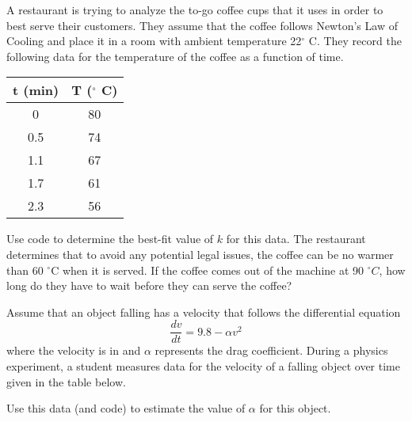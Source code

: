 \documentclass{ximera}
\begin{document}
\begin{exercise}
    A restaurant is trying to analyze the to-go coffee cups that it uses in order to best serve their customers. They assume that the coffee follows Newton's Law of Cooling and place it in a room with ambient temperature 22$^\circ$ C. They record the following data for the temperature of the coffee as a function of time.
    \begin{table}[h!!]
        \centering
        \begin{tabular}{|c|c|}\hline
             \textbf{t} (min)& \textbf{T} ($^\circ$ C)  \\ \hline
            0 & 80 \\
             0.5 & 74 \\
             1.1 & 67 \\
             1.7 & 61 \\
             2.3 & 56 \\ \hline
        \end{tabular}
    \end{table}
    \begin{tasks}
        \task Use code to determine the best-fit value of $k$ for this data.
        \task The restaurant determines that to avoid any potential legal issues, the coffee can be no warmer than 60 $^\circ$C when it is served. If the coffee comes out of the machine at 90 $^\circ C$, how long do they have to wait before they can serve the coffee?
    \end{tasks}
\end{exercise}

\newpage

\begin{exercise}\label{ex:ModelingParamVel}%
    Assume that an object falling has a velocity that follows the differential equation 
    \begin{equation*}
        \frac{dv}{dt} = 9.8 - \alpha v^2
    \end{equation*}
    where the velocity is in  and $\alpha$ represents the drag coefficient. During a physics experiment, a student measures data for the velocity of a falling object over time given in the table below.
    
    Use this data (and code) to estimate the value of $\alpha$ for this object. 
\end{exercise} 
\end{document}
